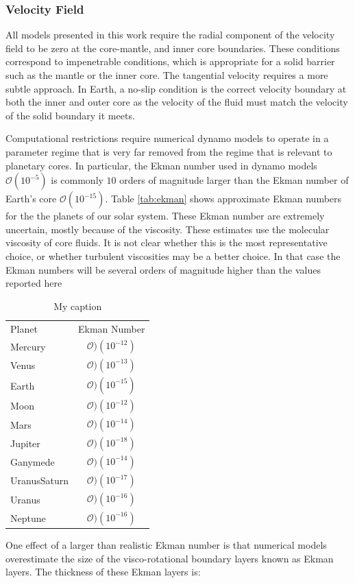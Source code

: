 \subsubsection{Velocity Field}
All models presented in this work require the radial component of the velocity field to be zero at the core-mantle, and inner core boundaries. These conditions correspond to  impenetrable conditions, which is appropriate for a solid barrier such as the mantle or the inner core. The tangential velocity requires a more subtle approach. In Earth, a no-slip  condition is the correct velocity boundary at both the inner and outer core as the velocity of the fluid must match the velocity of the solid boundary it meets. 

Computational restrictions require numerical dynamo models to operate in a parameter regime that is very far removed from the regime that is relevant to planetary cores. In particular, the Ekman number used in dynamo models $\mathcal{O}\left( 10^{-5} \right)$ is commonly $10$ orders of magnitude larger than the Ekman number of Earth's core $\mathcal{O}\left(10^{-15}\right)$. Table \ref{tab:ekman} shows approximate Ekman numbers for the the planets of our solar system. These Ekman number are extremely uncertain, mostly because of the viscosity. These estimates use the molecular viscosity of core fluids. It is not clear whether this is the most representative choice, or whether turbulent viscosities may be a better choice. In that case the Ekman numbers will be several orders of magnitude higher than the values reported here
\begin{table}[]
\label{tab:ekman}
\centering
\caption{My caption}
\label{my-label}
\begin{tabular}{lc}
Planet       & \multicolumn{1}{l}{Ekman Number} \\
Mercury      & $\mathcal{O})\left(10^{-12}\right)$                              \\
Venus        & $\mathcal{O})\left(10^{-13}\right)$                              \\
Earth        & $\mathcal{O})\left(10^{-15}\right)$                              \\
Moon         & $\mathcal{O})\left(10^{-12}\right)$                              \\
Mars         & $\mathcal{O})\left(10^{-14}\right)$                              \\
Jupiter      & $\mathcal{O})\left(10^{-18}\right)$                              \\
Ganymede     & $\mathcal{O})\left(10^{-14}\right)$                              \\
UranusSaturn & $\mathcal{O})\left(10^{-17}\right)$                              \\
Uranus       & $\mathcal{O})\left(10^{-16}\right)$                              \\
Neptune      & $\mathcal{O})\left(10^{-16}\right)$                             
\end{tabular}
\end{table}
One effect of a larger than realistic Ekman number is that numerical models overestimate the size of the visco-rotational boundary layers known as Ekman layers. The thickness of these Ekman layers is:

